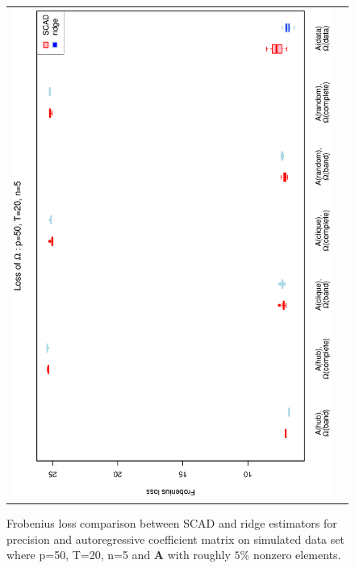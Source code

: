 \documentclass[a4paper]{article}
\begin{document}
\begin{figure}[h!]
\begin{tabular}{cc}
\includegraphics[scale=0.45,angle=270]{LossOmega50T20N5_5.eps}
\end{tabular}
\caption{Frobenius loss comparison between SCAD and ridge estimators for precision and autoregressive coefficient matrix on simulated data set where p=50, T=20, n=5  and $\mathbf{A}$ with roughly $5\%$ nonzero elements.}
\label{figSM:Loss50T20N5_5}
\end{figure}
\clearpage

\end{document}
